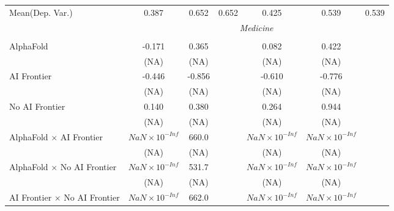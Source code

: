 \begin{tabular}{lcccccc}
Mean(Dep. Var.) & 0.387 & 0.652 & 0.652 & 0.425 & 0.539 & 0.539 \\
 & \multicolumn{6}{c}{\textit{Medicine}} \\ \\
   AlphaFold                                                                  & -0.171                 & 0.365  &        & 0.082                  & 0.422                  &   \\   
                                                                              & (NA)                   & (NA)   &        & (NA)                   & (NA)                   &   \\   
   AI Frontier                                                                & -0.446                 & -0.856 &        & -0.610                 & -0.776                 &   \\   
                                                                              & (NA)                   & (NA)   &        & (NA)                   & (NA)                   &   \\   
   No AI Frontier                                                             & 0.140                  & 0.380  &        & 0.264                  & 0.944                  &   \\   
                                                                              & (NA)                   & (NA)   &        & (NA)                   & (NA)                   &   \\   
   AlphaFold $\times$ AI Frontier                                             & $NaN\times 10^{-Inf}$  & 660.0  &        & $NaN\times 10^{-Inf}$  & $NaN\times 10^{-Inf}$  &   \\   
                                                                              & (NA)                   & (NA)   &        & (NA)                   & (NA)                   &   \\   
   AlphaFold $\times$ No AI Frontier                                          & $NaN\times 10^{-Inf}$  & 531.7  &        & $NaN\times 10^{-Inf}$  & $NaN\times 10^{-Inf}$  &   \\   
                                                                              & (NA)                   & (NA)   &        & (NA)                   & (NA)                   &   \\   
   AI Frontier $\times$ No AI Frontier                                        & $NaN\times 10^{-Inf}$  & 662.0  &        & $NaN\times 10^{-Inf}$  & $NaN\times 10^{-Inf}$  &   \\   

\end{tabular}
